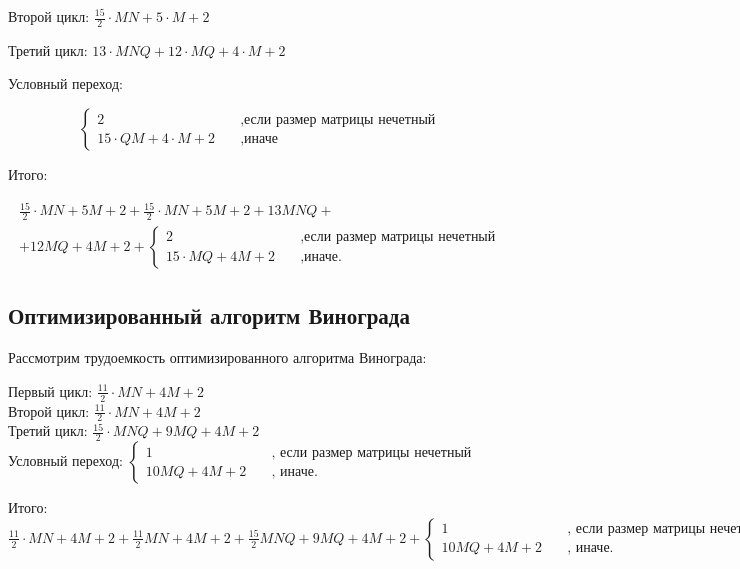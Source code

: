 Второй цикл: $\frac{15}{2} \cdot MN + 5 \cdot M + 2$

Третий цикл: $13 \cdot MNQ + 12 \cdot MQ + 4 \cdot M + 2$

Условный переход:

\begin{equation*}
    \begin{cases}
        2 & \quad \text{,если размер матрицы нечетный} \\
        15 \cdot QM + 4 \cdot M + 2 & \quad \text{,иначе}
    \end{cases}
\end{equation*}

Итого:

\begin{multline*}
    \frac{15}{2} \cdot MN + 5 M + 2 + \frac{15}{2} \cdot MN + 5 M + 2 + 13 MNQ + \\
     + 12 MQ + 4M + 2 + \begin{cases}
        2 & \quad \text{,если размер матрицы нечетный} \\
        15 \cdot MQ + 4M + 2 & \quad \text{,иначе.}
    \end{cases}
\end{multline*}

\subsection{Оптимизированный алгоритм Винограда}

Рассмотрим трудоемкость оптимизированного алгоритма Винограда:

\noindent
Первый цикл: $\frac{11}{2} \cdot MN + 4M + 2$ \\
Второй цикл: $\frac{11}{2} \cdot MN + 4M + 2$ \\
Третий цикл: $\frac{15}{2} \cdot MNQ + 9MQ + 4M + 2$ \\

\noindent
Условный переход: $ \begin{cases}
    1 & \quad \text{, если размер матрицы нечетный} \\
    10 MQ + 4M + 2 & \quad \text{, иначе.}
\end{cases} $

\noindent
Итого: $\frac{11}{2} \cdot MN + 4M + 2 + \frac{11}{2}MN + 4M + 2 + \frac{15}{2}MNQ + 9 MQ + 4M + 2 + \begin{cases}
    1 & \quad \text{, если размер матрицы нечетный} \\
    10 MQ + 4M + 2 & \quad \text{, иначе.}
\end{cases}$

